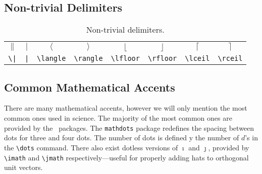 \subsection{Non-trivial Delimiters}
%
\begin{table}[!htbp]
    \centering
    \caption{Non-trivial delimiters.}
    \label{t:ntd}
    \begin{tabular}{cccccccc}
        $\|$ & $|$ & $\langle$ & $\rangle$ & $\lfloor$ & $\rfloor$ & $\lceil$ & $\rceil$ \\
        \verb+\|+ & \verb+|+ & \verb|\langle| & \verb|\rangle| & \verb|\lfloor| & \verb|\rfloor| & \verb|\lceil| & \verb|\rceil| \\
    \end{tabular}
\end{table}
%
\subsection{Common Mathematical Accents}
%
There are many mathematical accents, however we will only mention the
most common ones used in science.  The majority of the most common
ones are provided by the \AmSTeX~packages.  The \verb|mathdots|
package redefines the spacing between dots for three and four dots.
The number of dots is defined y the number of $d$'s in the
\verb|\dots| command.  There also exist dotless versions of $\imath$
and $\jmath$, provided by \verb|\imath| and \verb|\jmath|
respectively---useful for properly adding hats to orthogonal unit
vectors.

